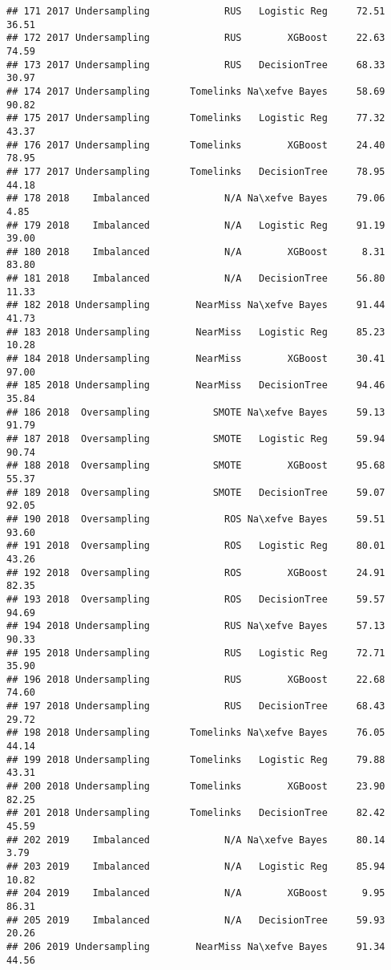 \documentclass[
]{article}
\begin{document}
\begin{verbatim}
## 171 2017 Undersampling             RUS   Logistic Reg     72.51  36.51
## 172 2017 Undersampling             RUS        XGBoost     22.63  74.59
## 173 2017 Undersampling             RUS   DecisionTree     68.33  30.97
## 174 2017 Undersampling       Tomelinks Na\xefve Bayes     58.69  90.82
## 175 2017 Undersampling       Tomelinks   Logistic Reg     77.32  43.37
## 176 2017 Undersampling       Tomelinks        XGBoost     24.40  78.95
## 177 2017 Undersampling       Tomelinks   DecisionTree     78.95  44.18
## 178 2018    Imbalanced             N/A Na\xefve Bayes     79.06   4.85
## 179 2018    Imbalanced             N/A   Logistic Reg     91.19  39.00
## 180 2018    Imbalanced             N/A        XGBoost      8.31  83.80
## 181 2018    Imbalanced             N/A   DecisionTree     56.80  11.33
## 182 2018 Undersampling        NearMiss Na\xefve Bayes     91.44  41.73
## 183 2018 Undersampling        NearMiss   Logistic Reg     85.23  10.28
## 184 2018 Undersampling        NearMiss        XGBoost     30.41  97.00
## 185 2018 Undersampling        NearMiss   DecisionTree     94.46  35.84
## 186 2018  Oversampling           SMOTE Na\xefve Bayes     59.13  91.79
## 187 2018  Oversampling           SMOTE   Logistic Reg     59.94  90.74
## 188 2018  Oversampling           SMOTE        XGBoost     95.68  55.37
## 189 2018  Oversampling           SMOTE   DecisionTree     59.07  92.05
## 190 2018  Oversampling             ROS Na\xefve Bayes     59.51  93.60
## 191 2018  Oversampling             ROS   Logistic Reg     80.01  43.26
## 192 2018  Oversampling             ROS        XGBoost     24.91  82.35
## 193 2018  Oversampling             ROS   DecisionTree     59.57  94.69
## 194 2018 Undersampling             RUS Na\xefve Bayes     57.13  90.33
## 195 2018 Undersampling             RUS   Logistic Reg     72.71  35.90
## 196 2018 Undersampling             RUS        XGBoost     22.68  74.60
## 197 2018 Undersampling             RUS   DecisionTree     68.43  29.72
## 198 2018 Undersampling       Tomelinks Na\xefve Bayes     76.05  44.14
## 199 2018 Undersampling       Tomelinks   Logistic Reg     79.88  43.31
## 200 2018 Undersampling       Tomelinks        XGBoost     23.90  82.25
## 201 2018 Undersampling       Tomelinks   DecisionTree     82.42  45.59
## 202 2019    Imbalanced             N/A Na\xefve Bayes     80.14   3.79
## 203 2019    Imbalanced             N/A   Logistic Reg     85.94  10.82
## 204 2019    Imbalanced             N/A        XGBoost      9.95  86.31
## 205 2019    Imbalanced             N/A   DecisionTree     59.93  20.26
## 206 2019 Undersampling        NearMiss Na\xefve Bayes     91.34  44.56

\end{verbatim}
\end{document}
